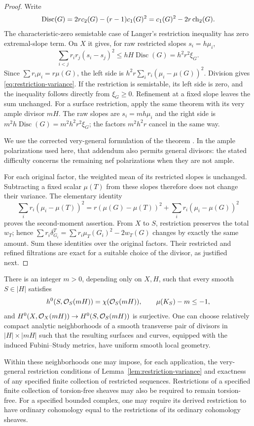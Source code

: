 \begin{proof}
Write
\[
 \operatorname{Disc}(G)
 =2r c_2(G)-(r-1)c_1(G)^2=c_1(G)^2-2r\operatorname{ch}_2(G).
\]
The characteristic-zero semistable case of Langer's restriction
inequality \cite[Theorem~3.1]{Langer2004} has zero extremal-slope
term.  On $X$ it gives, for raw restricted slopes $s_i=h\mu_i$,
\[
 \sum_{i<j}r_i r_j(s_i-s_j)^2
 \le hH\operatorname{Disc}(G)=h^2r^2\xi_G.
\]
Since $\sum r_i\mu_i=r\mu(G)$, the left side is
$h^2r\sum_i r_i(\mu_i-\mu(G))^2$.
Division gives \eqref{eq:restriction-variance}.  If the restriction is
semistable, its left side is zero, and the inequality follows directly
from $\xi_G\ge0$.  Refinement at a fixed slope leaves the sum unchanged.
For a surface restriction, apply the same theorem with its very ample
divisor $mH$.  The raw slopes are $s_i=mh\mu_i$ and the right side is
$m^2h\operatorname{Disc}(G)=m^2h^2r^2\xi_G$; the factors $m^2h^2r$
cancel in the same way.

We use the corrected very-general formulation of the theorem
\cite[p.~1211]{Langer2004Addendum}.  In the ample polarizations used
here, that addendum also permits general divisors: the stated
difficulty concerns the remaining nef polarizations when they are
not ample.

For each original factor, the weighted mean of its restricted slopes
is unchanged.  Subtracting a fixed scalar $\mu(T)$ from these slopes
therefore does not change their variance.  The elementary identity
\[
 \sum_i r_i(\mu_i-\mu(T))^2
 =r(\mu(G)-\mu(T))^2
   +\sum_i r_i(\mu_i-\mu(G))^2
\]
proves the second-moment assertion.  From $X$ to $S$, restriction
preserves the total $w_T$; hence
$\sum r_i\delta_{G_i}^T=\sum r_i\mu_T(G_i)^2-2w_T(G)$ changes by
exactly the same amount.  Sum these identities over the original
factors.  Their restricted and refined filtrations are exact for a
suitable choice of the divisor, as justified next.
\end{proof}

\begin{lemma}\label{lem:uniform-sections}
There is an integer $m>0$, depending only on $X,H$, such that every
smooth $S\in|H|$ satisfies
\begin{equation}\label{eq:surface-fixed-m}
 h^0(S,\mathcal O_S(mH))=\chi(\mathcal O_S(mH)),
 \qquad \mu(K_S)-m\le-1,
\end{equation}
and $H^0(X,\mathcal O_X(mH))\to H^0(S,\mathcal O_S(mH))$ is surjective.
One can choose relatively compact analytic neighborhoods of a smooth
transverse pair of divisors in $|H|\times|mH|$ such that the resulting
surfaces and curves, equipped with the induced Fubini--Study metrics,
have uniform smooth local geometry.

Within these neighborhoods one may impose, for each application, the
very-general restriction conditions of
Lemma~\ref{lem:restriction-variance} and exactness of any specified
finite collection of restricted sequences.  Restrictions of a
specified finite collection of torsion-free sheaves may also be
required to remain torsion-free.  For a specified bounded complex,
one may require its derived restriction to have ordinary cohomology
equal to the restrictions of its ordinary cohomology sheaves.
\end{lemma}

